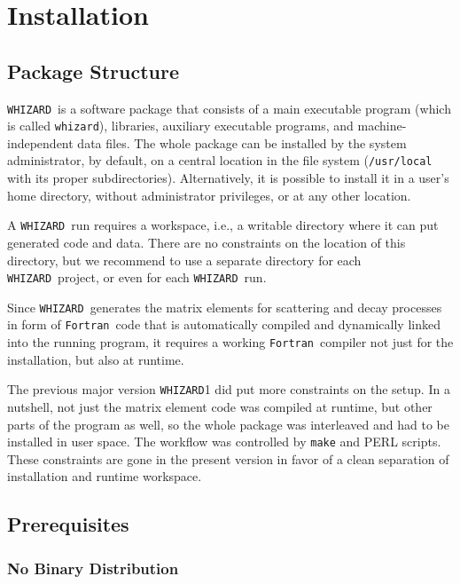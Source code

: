 \documentclass[12pt]{book}
\newcommand{\ttt}[1]{\texttt{#1}}
\newcommand{\whizard}{\ttt{WHIZARD}}
\newcommand{\fortran}{\ttt{Fortran}}
\begin{document}
\newpage
\chapter{Installation}
\label{chap:installation}

\section{Package Structure}

\whizard\ is a software package that consists of a main executable
program (which is called \ttt{whizard}), libraries, auxiliary
executable programs, and machine-independent data files.  The whole
package can be installed by the system administrator, by default, on a
central location in the file system (\ttt{/usr/local} with its proper
subdirectories).  Alternatively, it is possible to install it in a
user's home directory, without administrator privileges, or at any
other location.

A \whizard\ run requires a workspace, i.e., a writable directory where
it can put generated code and data.  There are no constraints on the
location of this directory, but we recommend to use a separate
directory for each \whizard\ project, or even for each \whizard\ run.

Since \whizard\ generates the matrix elements for scattering and decay
processes in form of \fortran\ code that is automatically compiled and
dynamically linked into the running program, it requires a working
\fortran\ compiler not just for the installation, but also at runtime.

The previous major version \whizard1 did put more constraints on the
setup.  In a nutshell, not just the matrix element code was compiled
at runtime, but other parts of the program as well, so the whole
package was interleaved and had to be installed in user space.  The
workflow was controlled by \ttt{make} and PERL scripts.  These
constraints are gone in the present version in favor of a clean
separation of installation and runtime workspace.


\section{\label{sec:prerequisites}Prerequisites}

\subsection{No Binary Distribution}
\end{document}
